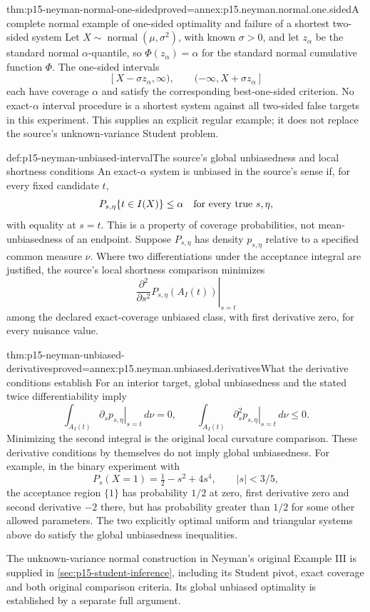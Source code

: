 \begin{hbtheorem}{thm:p15-neyman-normal-one-sided}{proved=annex:p15.neyman.normal.one.sided}{A complete normal example of one-sided optimality and failure of a shortest two-sided system}
Let \(X\sim\operatorname{normal}(\mu,\sigma^2)\), with known
\(\sigma>0\), and let \(z_\alpha\) be the standard normal
\(\alpha\)-quantile, so \(\Phi(z_\alpha)=\alpha\) for the
standard normal cumulative function \(\Phi\). The one-sided intervals
\[
             [X-\sigma z_\alpha,\infty),\qquad
             (-\infty,X+\sigma z_\alpha]
\]
each have coverage \(\alpha\) and satisfy the corresponding
best-one-sided criterion.
No exact-\(\alpha\) interval procedure is a shortest system
against all two-sided false targets in this experiment.
This supplies an explicit regular example; it does not replace
the source's unknown-variance Student problem.
\end{hbtheorem}

\begin{hbdefinition}{def:p15-neyman-unbiased-interval}{The source's global unbiasedness and local shortness conditions}
An exact-\(\alpha\) system is unbiased in the source's sense if,
for every fixed candidate \(t\),
\[
                   P_{s,\eta}\{t\in I(X)\}\leq\alpha
                              \quad\hbox{for every true }s,\eta,
\]
with equality at \(s=t\).
This is a property of coverage probabilities, not mean-unbiasedness
of an endpoint.
Suppose \(P_{s,\eta}\) has density \(p_{s,\eta}\) relative to
a specified common measure \(\nu\). Where two differentiations
under the acceptance integral are justified, the source's local shortness comparison minimizes
\[
             \left.\frac{\partial^2}{\partial s^2}
                            P_{s,\eta}(A_I(t))\right|_{s=t}
\]
among the declared exact-coverage unbiased class, with first
derivative zero, for every nuisance value.
\end{hbdefinition}

\begin{hbtheorem}{thm:p15-neyman-unbiased-derivatives}{proved=annex:p15.neyman.unbiased.derivatives}{What the derivative conditions establish}
For an interior target, global unbiasedness and the stated
twice differentiability imply
\[
 \int_{A_I(t)}\left.\partial_s p_{s,\eta}\right|_{s=t}\,d\nu=0,\qquad
 \int_{A_I(t)}\left.\partial_s^2 p_{s,\eta}\right|_{s=t}\,d\nu\leq0.
\]
Minimizing the second integral is the original local curvature
comparison. These derivative conditions by themselves do not
imply global unbiasedness.
For example, in the binary experiment with
\[
 P_s(X=1)=\tfrac12-s^2+4s^4,\qquad |s|<3/5,
\]
the acceptance region \(\{1\}\) has probability \(1/2\) at zero,
first derivative zero and second derivative \(-2\) there,
but has probability greater than \(1/2\) for some other
allowed parameters.
The two explicitly optimal uniform and triangular systems above
do satisfy the global unbiasedness inequalities.
\end{hbtheorem}

The unknown-variance normal construction in Neyman's original Example III
is supplied in \cref{sec:p15-student-inference}, including its Student
pivot, exact coverage and both original comparison criteria. Its global
unbiased optimality is established by a separate full argument.
